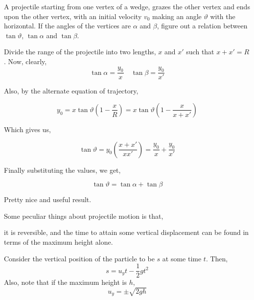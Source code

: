 \begin{example}
    A projectile starting from one vertex of a wedge, grazes the other 
    vertex and ends upon the other vertex, with an initial velocity 
    \(v_0\) making an angle \(\vartheta\) with the horizontal. If the
    angles of the vertices are \(\alpha\) and \(\beta\), figure 
    out a relation between \(\tan \vartheta\), \(\tan\alpha\) and \(\tan\beta\).

    \begin{soln}
        Divide the range of the projectile into two lengths, \(x\) and 
        \(x'\) such that \(x + x' = R\). Now, clearly, 
        \begin{equation*}
            \tan\alpha = \frac{y_0}{x} \quad \tan\beta = \frac{y_0}{x'}
        \end{equation*}

        Also, by the alternate equation of trajectory,

        \begin{equation*}
            y_0 = x\tan\vartheta\left(1 - \frac{x}{R}\right) = x\tan\vartheta\left(1 - \frac{x}{x + x'}\right) 
        \end{equation*}

        Which gives us, 

        \begin{equation*}
            \tan\vartheta = y_0 \left(\frac{x + x'}{xx'}\right) = \frac{y_0}{x} + \frac{y_0}{x'}
        \end{equation*}

        Finally substituting the values, we get, 

        \begin{equation}
            \tan\vartheta = \tan\alpha + \tan\beta
        \end{equation}
        
        Pretty nice and useful result.

    \end{soln}
\end{example}

Some peculiar things about projectile motion is that, \begin{inparaenum}[a)]
    \ii it is reversible, and
    \ii the time to attain some vertical displacement can be found in terms of 
    the maximum height alone.
\end{inparaenum}

Consider the vertical position of the particle to be 
\(s\) at some time \(t\). Then, 
\[s = u_yt - \frac{1}{2}gt^2\] 
Also, note that if the maximum height is \(h\), 
\[u_y = \pm \sqrt{2gh}\]

